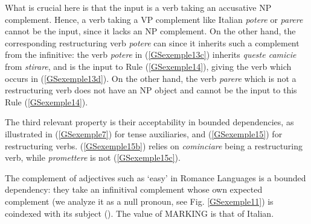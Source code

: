 \documentclass[output=paper
                ,modfonts
                ,nonflat
	        ,collection
	        ,collectionchapter
	        ,collectiontoclongg
 	        ,biblatex
                ,babelshorthands
                ,newtxmath
                ,draftmode
                ,colorlinks, citecolor=brown
]{./langsci/langscibook}
\begin{document}
{What is crucial here is that the input is a verb taking an accusative NP complement. Hence, a verb taking a VP complement like Italian \emph{potere} or \emph{parere} cannot be the input, since it lacks an NP complement. On the other hand, the corresponding restructuring verb \emph{potere} can since it inherits such a complement from the infinitive: the verb \emph{potere} in (\ref{GSexemple13c}) inherits \emph{queste camicie} from \emph{stirare}, and is the input to Rule (\ref{GSexemple14}), giving the verb which occurs in (\ref{GSexemple13d}). On the other hand, the verb \emph{parere} which is not a restructuring verb does not have an NP object and cannot be the input to this Rule (\ref{GSexemple14}).

The third relevant property is their acceptability in bounded dependencies, as illustrated in (\ref{GSexemple7}) for tense auxiliaries, and (\ref{GSexemple15}) for restructuring verbs. (\ref{GSexemple15b}) relies on \emph{cominciare} being a restructuring verb, while \emph{promettere} is not (\ref{GSexemple15c}).  

\eal 
	\label{GSexemple15} 
    \label{GSexemple15a} 
		
	\label{GSexemple15b}
		
	\label{GSexemple15c} 	
\zl

The complement of adjectives such as `easy' in Romance Languages is a bounded dependency: they take an infinitival complement whose own expected complement (we analyze it as a null pronoun, see Fig. \ref{GSexemple11}) is coindexed with its subject (\citealt{AGS1998, Monachesi98a}). The value of MARKING is that of Italian.

\begin{exe}
\end{exe}

}
\end{document}
